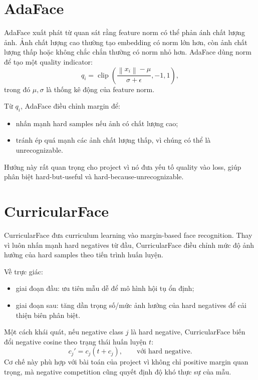 \documentclass[13pt,a4paper]{extreport}
\newcommand{\norm}[1]{\left\lVert #1 \right\rVert}
\newcommand{\clip}{\operatorname{clip}}
\begin{document}
\section{AdaFace}
AdaFace xuất phát từ quan sát rằng feature norm có thể phản ánh chất lượng ảnh. Ảnh chất lượng cao thường tạo embedding có norm lớn hơn, còn ảnh chất lượng thấp hoặc không chắc chắn thường có norm nhỏ hơn. AdaFace dùng norm để tạo một quality indicator:
\begin{equation}
    q_i = \clip\left( \frac{\norm{x_i}-\mu}{\sigma+\epsilon}, -1, 1 \right),
\end{equation}
trong đó $\mu,\sigma$ là thống kê động của feature norm.

Từ $q_i$, AdaFace điều chỉnh margin để:
\begin{itemize}[leftmargin=1.2cm]
    \item nhấn mạnh hard samples nếu ảnh có chất lượng cao;
    \item tránh ép quá mạnh các ảnh chất lượng thấp, vì chúng có thể là unrecognizable.
\end{itemize}

Hướng này rất quan trọng cho project vì nó đưa yếu tố quality vào loss, giúp phân biệt hard-but-useful và hard-because-unrecognizable.

\section{CurricularFace}
CurricularFace đưa curriculum learning vào margin-based face recognition. Thay vì luôn nhấn mạnh hard negatives từ đầu, CurricularFace điều chỉnh mức độ ảnh hưởng của hard samples theo tiến trình huấn luyện.

Về trực giác:
\begin{itemize}[leftmargin=1.2cm]
    \item giai đoạn đầu: ưu tiên mẫu dễ để mô hình hội tụ ổn định;
    \item giai đoạn sau: tăng dần trọng số/mức ảnh hưởng của hard negatives để cải thiện biên phân biệt.
\end{itemize}

Một cách khái quát, nếu negative class $j$ là hard negative, CurricularFace biến đổi negative cosine theo trạng thái huấn luyện $t$:
\begin{equation}
    c_j' = c_j(t+c_j), \qquad \text{với hard negative.}
\end{equation}
Cơ chế này phù hợp với bài toán của project vì không chỉ positive margin quan trọng, mà negative competition cũng quyết định độ khó thực sự của mẫu.
\end{document}
